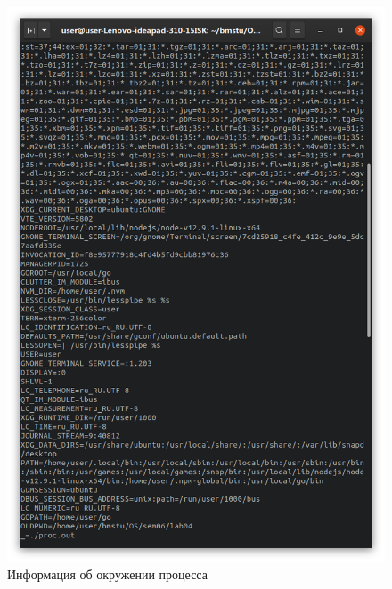 \documentclass[a4paper,oneside,12pt]{extreport}
\begin{document}
\begin{figure}[H]
	\includegraphics[scale=0.325]{inc/img/task1-environ2}
	\caption{Информация об окружении процесса}
	\label{img:task1-environ}
\end{figure}
\end{document}
